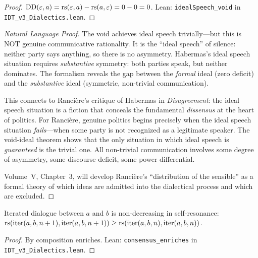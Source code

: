 \begin{proof}
$\mathrm{DD}(\varepsilon, a) = \mathrm{rs}(\varepsilon, a) - \mathrm{rs}(a, \varepsilon) = 0 - 0 = 0$.
Lean: \texttt{idealSpeech\_void} in \texttt{IDT\_v3\_Dialectics.lean}.
\end{proof}

\begin{proof}[Natural Language Proof]
The void achieves ideal speech trivially---but this is NOT genuine communicative
rationality. It is the ``ideal speech'' of silence: neither party says
anything, so there is no asymmetry. Habermas's ideal speech situation requires
\emph{substantive} symmetry: both parties speak, but neither dominates.
The formalism reveals the gap between the \emph{formal} ideal (zero deficit)
and the \emph{substantive} ideal (symmetric, non-trivial communication).

This connects to Rancière's critique of Habermas in \textit{Disagreement}:
the ideal speech situation is a fiction that conceals the fundamental
\emph{dissensus} at the heart of politics. For Rancière, genuine politics
begins precisely when the ideal speech situation \emph{fails}---when some
party is not recognized as a legitimate speaker. The void-ideal theorem
shows that the only situation in which ideal speech is \emph{guaranteed}
is the trivial one. All non-trivial communication involves some degree of
asymmetry, some discourse deficit, some power differential.

Volume~V, Chapter~3, will develop Rancière's ``distribution of the sensible''
as a formal theory of which ideas are admitted into the dialectical process
and which are excluded.
\end{proof}

\begin{theorem}
\label{thm:consensus-enriches}
Iterated dialogue between $a$ and $b$ is non-decreasing in self-resonance:
$\mathrm{rs}(\mathrm{iter}(a, b, n+1), \mathrm{iter}(a, b, n+1)) \geq
\mathrm{rs}(\mathrm{iter}(a, b, n), \mathrm{iter}(a, b, n))$.
\end{theorem}

\begin{proof}
By composition enriches.
Lean: \texttt{consensus\_enriches} in \texttt{IDT\_v3\_Dialectics.lean}.
\end{proof}

